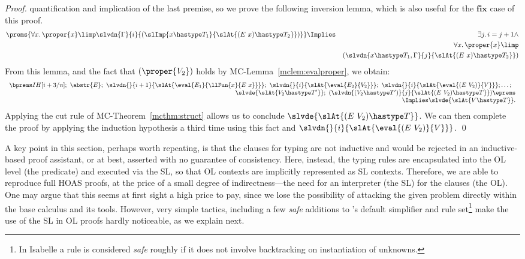 \documentclass[final]{svjour3}
\begin{document}
\begin{proof}
quantification and implication of the last premise, so we prove the
following inversion lemma, which is also useful for the $\mathbf{fix}$
case of this proof.
\begin{eqnarray}
  \label{eq:ol-prop}
\prems{\forall x.\, \proper{x}\limp
 \slvdn{\Gamma}{i}{(\slImp{x\hastype T_1}{\slAt{(E\ x)\hastype T_2}})}}
&\Implies&
\exists j.\, i=j+1\land\\\nonumber
&&
\forall x.\, \proper{x}\limp\\\nonumber
&&
(\slvdn{x\hastype T_1,\Gamma}{j}{\slAt{(E\ x)\hastype T_2}})
\end{eqnarray}
From this lemma, and the fact that $(\proper{V_2})$ holds by
MC-Lemma~\ref{mclem:evalproper}, we obtain:
$$\begin{array}{rcl}
\bprems IH[i+3/n];\,\,\abstr{E};\,\,
 \slvdn{}{i+1}{\slAt{\eval{E_1}{\llFun{x}{E\ x}}}};\,\,
 \slvdn{}{i}{\slAt{\eval{E_2}{V_2}}};\,\,
 \slvdn{}{i}{\slAt{\eval{(E\ V_2)}{V}}};\ldots;~~\\
~~\slvde{\slAt{V_2\hastype T'}};\,\,
 (\slvdn{(V_2\hastype T')}{j}{\slAt{(E\ V_2)\hastype T}})
\eprems\\
 \Implies  \slvde{\slAt{V \hastype T}}.
\end{array}$$
Applying the cut rule of MC-Theorem~\ref{mcthm:struct} allows
us to conclude $\slvde{\slAt{(E\ V_2)\hastype T}}$.  We can then
complete the proof by applying the induction hypothesis a third time
using this fact and $\slvdn{}{i}{\slAt{\eval{(E\ V_2)}{V}}}$.
\qed\end{proof}



A key point in this section, perhaps worth repeating, is that the
clauses for typing are not inductive and would be rejected in an
inductive-based proof assistant, or at best, asserted with no
guarantee of consistency. Here, instead, the typing rules are
encapsulated into the OL level (the  predicate) and executed
via the SL, so that OL contexts are implicitly represented as SL
contexts. Therefore, we are able to reproduce full HOAS proofs, at the
price of a small degree of indirectness---the need for an interpreter
(the SL) for the  clauses (the OL).  One may argue that
this seems at first sight a high price to pay, since we lose the possibility of attacking the
given problem directly within the base calculus and its
tools. However, very simple tactics, including a few \emph{safe} additions to
\HOL's default simplifier and rule set\footnote{In Isabelle a rule is
  considered \emph{safe} roughly if it does not involve backtracking
  on instantiation of unknowns.} make the use of the SL in OL proofs
hardly noticeable, as we explain next.
\end{document}
